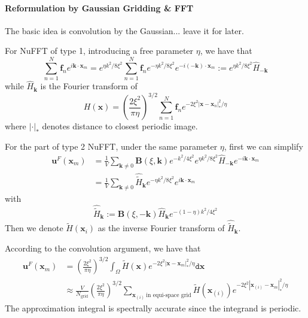 \documentclass{article}[12pt]
\begin{document}
\paragraph{Reformulation by Gaussian Gridding \& FFT} 
The basic idea is convolution by the Gaussian... leave it for later.

For NuFFT of type 1, introducing a free parameter $\eta$, we have that
\begin{equation}
\sum_{n=1}^{N} \mathbf{f}_n e ^{i \mathbf{k} \cdot \mathbf{x}_m }  = e^{\eta k^2 / 8 \xi^2} \sum_{n=1}^{N} \mathbf{f}_n e^{-\eta k^2 / 8 \xi^2} e ^{-i (\mathbf{-k}) \cdot \mathbf{x}_m }  := e^{\eta k^2 / 8 \xi^2} \hat{H}_{\mathbf{-k}}
\end{equation}
while $\hat{H}_{\mathbf{k}}$ is the Fourier transform of 
\begin{equation}
H(\mathbf{x}) = \left(\frac{2 \xi^2}{\pi \eta}\right)^{3/2}  \sum_{n=1}^N \mathbf{f}_n e^{-2 \xi^2 |\mathbf{x} - \mathbf{x}_n|_{\ast}^2 / \eta} \label{eq:gaussian_gridding_1}
\end{equation}
where $|\cdot|_{\ast}$ denotes distance to closest periodic image. 

For the part of type 2 NuFFT, under the same parameter $\eta$, first we can simplify 
\begin{align}
\mathbf{u}^F (\mathbf{x}_m) & = \frac{1}{V} \sum_{\mathbf{k} \neq 0} \mathbf{B}(\xi, \mathbf{k}) e^{-k^2/4\xi^2} e^{\eta k^2 / 8 \xi^2} \hat{H}_{\mathbf{-k}} e ^{-i \mathbf{k} \cdot \mathbf{x}_m} \\
& = \frac{1}{V} \sum_{\mathbf{k} \neq 0} \hat{\tilde{H}}_{\mathbf{k}} e^{- \eta k^2 / 8 \xi^2}  e ^{i \mathbf{k} \cdot \mathbf{x}_m} 
\end{align}
with 
\begin{equation}
\hat{\tilde{H}}_{\mathbf{k}} := \mathbf{B}(\xi, \mathbf{-k}) \hat{H}_{\mathbf{k}} e^{-(1-\eta)k^2 / 4\xi^2} \label{eq:hat_tilde_h_formula}
\end{equation}
Then we denote $\tilde{H}(\mathbf{x}_i)$ as the inverse Fourier transform of $
\hat{\tilde{H}}_{\mathbf{k}}$.

According to the convolution argument, we have that
\begin{align}
\mathbf{u}^F (\mathbf{x}_m) & =  \left(\frac{2 \xi^2}{\pi \eta}\right)^{3/2}  \int_{\Omega} \tilde{H}(\mathbf{x}) e^{-2 \xi^2 |\mathbf{x} - \mathbf{x}_m|_{\ast}^2 / \eta} \mathtt{d} \mathbf{x} \\
& \approx \frac{V}{N_{\text{grid}}} \left(\frac{2 \xi^2}{\pi \eta}\right)^{3/2} \sum_{\mathbf{x}_{(i)} \ \text{in equi-space grid}} \tilde{H}(\mathbf{x}_{(i)}) e^{-2 \xi^2 |\mathbf{x}_{(i)} - \mathbf{x}_m|_{\ast}^2 / \eta} \label{eq:gaussian_gridding_2}
\end{align}
The approximation integral is spectrally accurate since the integrand is periodic.
\end{document}

